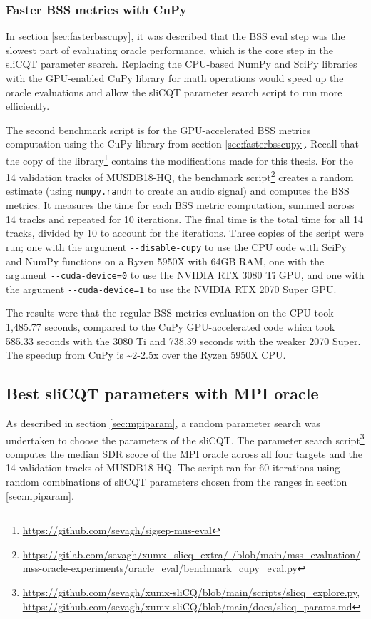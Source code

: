\documentclass[report.tex]{subfiles}
\begin{document}
\subsubsection{Faster BSS metrics with CuPy}

In section \ref{sec:fasterbsscupy}, it was described that the BSS eval step was the slowest part of evaluating oracle performance, which is the core step in the sliCQT parameter search. Replacing the CPU-based NumPy and SciPy libraries with the GPU-enabled CuPy library for math operations would speed up the oracle evaluations and allow the sliCQT parameter search script to run more efficiently.

The second benchmark script is for the GPU-accelerated BSS metrics computation using the CuPy library from section \ref{sec:fasterbsscupy}. Recall that the copy of the library\footnote{\url{https://github.com/sevagh/sigsep-mus-eval}} contains the modifications made for this thesis. For the 14 validation tracks of MUSDB18-HQ, the benchmark script\footnote{\url{https://gitlab.com/sevagh/xumx_slicq_extra/-/blob/main/mss_evaluation/mss-oracle-experiments/oracle_eval/benchmark_cupy_eval.py}}  creates a random estimate (using \Verb#numpy.randn# to create an audio signal) and computes the BSS metrics. It measures the time for each BSS metric computation, summed across 14 tracks and repeated for 10 iterations. The final time is the total time for all 14 tracks, divided by 10 to account for the iterations. Three copies of the script were run; one with the argument \Verb#--disable-cupy# to use the CPU code with SciPy and NumPy functions on a Ryzen 5950X with 64GB RAM, one with the argument \Verb#--cuda-device=0# to use the NVIDIA RTX 3080 Ti GPU, and one with the argument \Verb#--cuda-device=1# to use the NVIDIA RTX 2070 Super GPU.

The results were that the regular BSS metrics evaluation on the CPU took 1,485.77 seconds, compared to the CuPy GPU-accelerated code which took 585.33 seconds with the 3080 Ti and 738.39 seconds with the weaker 2070 Super. The speedup from CuPy is \textasciitilde 2-2.5x over the Ryzen 5950X CPU.

\newpagefill

\subsection{Best sliCQT parameters with MPI oracle}

As described in section \ref{sec:mpiparam}, a random parameter search was undertaken to choose the parameters of the sliCQT. The parameter search script\footnote{\url{https://github.com/sevagh/xumx-sliCQ/blob/main/scripts/slicq_explore.py}, \url{https://github.com/sevagh/xumx-sliCQ/blob/main/docs/slicq_params.md}} computes the median SDR score of the MPI oracle across all four targets and the 14 validation tracks of MUSDB18-HQ. The script ran for 60 iterations using random combinations of sliCQT parameters chosen from the ranges in section \ref{sec:mpiparam}.
\end{document}
